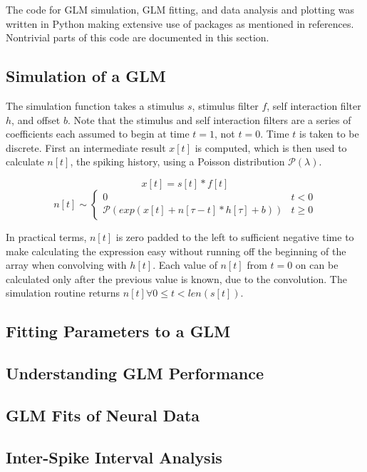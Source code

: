 \documentclass[letterpaper,titlepage,10pt]{article}
\begin{document}
The code for GLM simulation, GLM fitting, and data analysis and plotting was written in Python making extensive use
of packages as mentioned in references. Nontrivial parts of this code are documented in this section.

\subsection{Simulation of a GLM}

The simulation function takes a stimulus $s$, stimulus filter $f$, self interaction filter $h$, and offset $b$. Note
that the stimulus and self interaction filters are a series of coefficients each assumed to begin at time $t=1$, not
$t=0$. Time $t$ is taken to be discrete. First an intermediate result $x[t]$ is computed, which is then used to
calculate $n[t]$, the spiking history, using a Poisson distribution $\mathcal{P}(\lambda)$.

$$x[t]=s[t]*f[t]$$
$$n[t]\sim
\begin{cases}
0 & t < 0\\
\mathcal{P}(exp(x[t]+n[\tau-t]*h[\tau]+b)) & t \geq 0
\end{cases}$$

In practical terms, $n[t]$ is zero padded to the left to sufficient negative time to make calculating the expression
easy without running off the beginning of the array when convolving with $h[t]$. Each value of $n[t]$ from $t=0$ on
can be calculated only after the previous value is known, due to the convolution. The simulation routine returns
$n[t] \forall 0 \leq t < len(s[t])$.

\subsection{Fitting Parameters to a GLM}

\subsection{Understanding GLM Performance}

\subsection{GLM Fits of Neural Data}

\subsection{Inter-Spike Interval Analysis}
\end{document}
